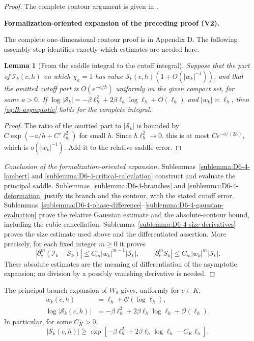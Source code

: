 \documentclass[11pt]{article}
\newtheorem{lemma}[theorem]{Lemma}
\newcommand{\formalisationparentid}{X}
\newenvironment{formalisationaddition}[1]{\par\medskip\begingroup\color{blue}\def\formalisationparentid{#1}\setcounter{formalizationsublemma}{0}\let\lemma\formalizationsublemma\let\endlemma\endformalizationsublemma
  \def\Eo{\mathcal E_h^\circ}\def\EE{\mathcal E_h}\def\phio{\phi_h^\circ}\def\phih{\phi_h}\def\Ho{H_h^{\rm atom}(v^\circ)}\def\Ha{H_h^{\rm atom}}\def\HL{H_h^{L}}\def\Dh{D_h}\def\Log{\operatorname{Log}}\def\ellh{\ell_h}\def\Gp{G_{p,h}}\def\Ast{A_{*,h}}\def\ahat{\widehat{\mathfrak a}_h}\def\ah{\mathfrak a_h}\def\rh{\widehat\rho_h}\def\deltah{\widehat\delta_h}\def\oldref##1{\textup{(##1)}}\def\interface##1{\par\noindent\textit{Analytical interface used here.} ##1\par}\def\finish{\par\noindent\textit{Conclusion of the formalization-oriented expansion.} }\par\noindent\textbf{Formalization-oriented expansion of the preceding proof (V2).}\par\smallskip
}{\par\endgroup\medskip
}
\newcommand{\cO}{\mathcal O}
\begin{document}
\begin{proof}
The complete contour argument is given in
.

\begin{formalisationaddition}{T6.4}
The complete one-dimensional contour proof is in Appendix D. The following assembly step identifies exactly which estimates are needed here.

\begin{lemma}[From the saddle integral to the cutoff integral]\label{sublemma:T6-4-assembly}
Suppose that the part of $\mathcal I_k(c,h)$ on which $\chi_a=1$ has value $\mathcal S_k(c,h)(1+O(|w_k|^{-1}))$, and that the omitted cutoff part is $O(e^{-a/h})$ uniformly on the given compact set, for some $a>0$. If $\log|\mathcal S_k|=-\beta\ellh^2+2\beta\ellh\log\ellh+O(\ellh)$ and $|w_k|\asymp\ellh$, then \eqref{eq:Ik-asymptotic} holds for the complete integral.
\end{lemma}
\begin{proof}
The ratio of the omitted part to $|\mathcal S_k|$ is bounded by $C\exp(-a/h+C'\ellh^2)$ for small $h$. Since $h\ellh^2\to0$, this is at most $Ce^{-a/(2h)}$, which is $o(|w_k|^{-1})$. Add it to the relative saddle error.
\end{proof}
\finish Sublemmas~\ref{sublemma:D6-4-lambert} and \ref{sublemma:D6-4-critical-calculation} construct and evaluate the principal saddle. Sublemmas~\ref{sublemma:D6-4-branches} and \ref{sublemma:D6-4-deformation} justify its branch and the contour, with the stated cutoff error. Sublemmas~\ref{sublemma:D6-4-phase-difference}--\ref{sublemma:D6-4-gaussian-evaluation} prove the relative Gaussian estimate and the absolute-contour bound, including the cubic cancellation. Sublemma~\ref{sublemma:D6-4-size-derivatives} proves the size estimate used above and the differentiated assertion. More precisely, for each fixed integer $m\ge0$ it proves
\[
 |\partial_c^m(\mathcal I_k-\mathcal S_k)|\le C_m|w_k|^{m-1}|\mathcal S_k|,
 \qquad |\partial_c^mS_k|\le C_m|w_k|^m|\mathcal S_k|.
\]
These absolute estimates are the meaning of differentiation of the asymptotic expansion; no division by a possibly vanishing derivative is needed.
\end{formalisationaddition}

\end{proof}

The principal-branch expansion of $W_0$ gives, uniformly for $c\in K$,
\begin{align}
 w_k(c,h)&=\ell_h+\cO(\log\ell_h),\label{eq:wk-size}\\
 \log|\mathcal S_k(c,h)|
 &=-\beta\ell_h^2+2\beta\ell_h\log\ell_h+\cO(\ell_h).
 \label{eq:Sk-log-size}
\end{align}
In particular, for some $C_K>0$,
\begin{equation}\label{eq:Qk-lower-rough}
 |\mathcal S_k(c,h)|
 \ge\exp\!\left[-\beta\ell_h^2
 +2\beta\ell_h\log\ell_h-C_K\ell_h\right].
\end{equation}
\end{document}
